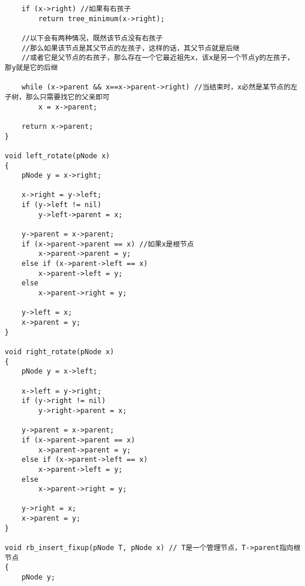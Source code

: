 \begin{verbatim}
    if (x->right) //如果有右孩子
        return tree_minimum(x->right);

    //以下会有两种情况，既然该节点没有右孩子
    //那么如果该节点是其父节点的左孩子，这样的话，其父节点就是后继
    //或者它是父节点的右孩子，那么存在一个它最近祖先x，该x是另一个节点y的左孩子，那y就是它的后继

    while (x->parent && x==x->parent->right) //当结束时，x必然是某节点的左子树，那么只需要找它的父亲即可
        x = x->parent;

    return x->parent;
}

void left_rotate(pNode x)
{
    pNode y = x->right;

    x->right = y->left;
    if (y->left != nil)
        y->left->parent = x;

    y->parent = x->parent;
    if (x->parent->parent == x) //如果x是根节点
        x->parent->parent = y;
    else if (x->parent->left == x)
        x->parent->left = y;
    else
        x->parent->right = y;

    y->left = x;
    x->parent = y;
}

void right_rotate(pNode x)
{
    pNode y = x->left;

    x->left = y->right;
    if (y->right != nil)
        y->right->parent = x;

    y->parent = x->parent;
    if (x->parent->parent == x)
        x->parent->parent = y;
    else if (x->parent->left == x)
        x->parent->left = y;
    else
        x->parent->right = y;

    y->right = x;
    x->parent = y;
}

void rb_insert_fixup(pNode T, pNode x) // T是一个管理节点，T->parent指向根节点
{
    pNode y;


\end{verbatim}
